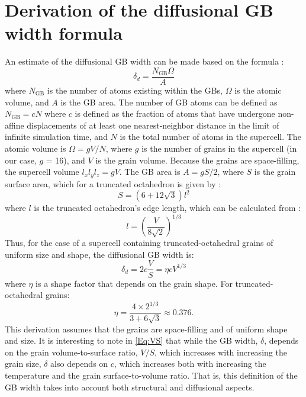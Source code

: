 \documentclass[preprint,12pt,sort&compress]{elsarticle} %
\newcommand{\?}{\stackrel{?}{=}}
\providecommand{\DIFaddbegin}{\protect\color{blue}} %
\providecommand{\DIFaddend}{\protect\color{black}} %
\providecommand{\DIFdelbegin}{\protect\color{red}} %
\providecommand{\DIFdelend}{\protect\color{black}} %
\newcommand{\DIFscaledelfig}{0.5}
\newlength{\DIFdelgraphicswidth} %
\newlength{\DIFdelgraphicsheight} %
\newcommand{\DIFaddincludegraphics}[2][]{{\color{blue}\fbox{\DIFOincludegraphics[#1]{#2}}}} %
\newcommand{\DIFdelincludegraphics}[2][]{%
\sbox{\DIFdelgraphicsbox}{\DIFOincludegraphics[#1]{#2}}%
\settoboxwidth{\DIFdelgraphicswidth}{\DIFdelgraphicsbox} %
\settoboxtotalheight{\DIFdelgraphicsheight}{\DIFdelgraphicsbox} %
\scalebox{\DIFscaledelfig}{%
\parbox[b]{\DIFdelgraphicswidth}{\usebox{\DIFdelgraphicsbox}\\[-\baselineskip] \rule{\DIFdelgraphicswidth}{0em}}\llap{\resizebox{\DIFdelgraphicswidth}{\DIFdelgraphicsheight}{%
\setlength{\unitlength}{\DIFdelgraphicswidth}%
\begin{picture}(1,1)%
\thicklines\linethickness{2pt} %
{\color[rgb]{1,0,0}\put(0,0){\framebox(1,1){}}}%
{\color[rgb]{1,0,0}\put(0,0){\line( 1,1){1}}}%
{\color[rgb]{1,0,0}\put(0,1){\line(1,-1){1}}}%
\end{picture}%
}\hspace*{3pt}}} %
} %
\DeclareRobustCommand{\DIFaddbegin}{\DIFOaddbegin \let\includegraphics\DIFaddincludegraphics} %
\DeclareRobustCommand{\DIFaddend}{\DIFOaddend \let\includegraphics\DIFOincludegraphics} %
\DeclareRobustCommand{\DIFdelbegin}{\DIFOdelbegin \let\includegraphics\DIFdelincludegraphics} %
\DeclareRobustCommand{\DIFdelend}{\DIFOaddend \let\includegraphics\DIFOincludegraphics} %
\begin{document}
\appendix

\section{Derivation of the diffusional GB width formula}
\label{app}

An estimate of the diffusional GB width can be made based on the formula \cite{Keblinski1999}:
\begin{equation}
\delta_d = \frac{N_{\mathrm{GB}} \Omega}{A} 
\label{Eq:dNGB}
\end{equation}
where $N_{\mathrm{GB}}$ is the number of atoms existing within the GBs, $\Omega$ is the atomic volume, and $A$ is the GB area. The number of GB atoms can be defined as $N_\mathrm{GB} = c N$ \cite{Haslam2004} where $c$ is defined as the fraction of atoms that have undergone non-affine displacements of at least one nearest-neighbor distance in the limit of infinite simulation time, and $N$ is the total number of atoms in the supercell. The atomic volume is $\Omega = gV/N$, where $g$ is the number of grains in the supercell (in our case, $g$ = 16), and $V$ is the grain volume. Because the grains are space-filling, the supercell volume $l_x l_y l_z = gV$. The GB area is $A = g S / 2$, where $S$ is the grain surface area, which for a truncated octahedron is given by \cite{Weisstein}:
\begin{equation}
S = \left( 6 + 12 \sqrt{3} \right) l^2    
\end{equation}
where $l$ is the truncated octahedron's edge length, which can be calculated from \cite{Weisstein}:
\begin{equation}
l = \left( \frac{V}{8 \sqrt{2}} \right)^{1/3}
\end{equation}
Thus, for the case of a supercell containing truncated-octahedral grains of uniform size and shape, the diffusional GB width is:
\begin{equation}
\delta_d = 2 c \frac{V}{S} = \eta c V^{1/3}
\label{Eq:VS}
\end{equation}
where $\eta$ is a shape factor that depends on the grain shape. For truncated-octahedral grains:
\DIFdelbegin %
\DIFdelend \DIFaddbegin \begin{equation}\label{eq:shape}
\eta = \frac{4 \times 2^{1/3}}{3 + 6 \sqrt{3}} \approx 0.376.
\end{equation}\DIFaddend 
This derivation assumes that the grains are space-filling and of uniform shape and size. It is interesting to note in \cref{Eq:VS} that while the GB width, $\delta$, depends on the grain volume-to-surface ratio, $V/S$, which increases with increasing the grain size, $\delta$ also depends on $c$, which increases both with increasing the temperature and the grain surface-to-volume ratio. That is, this definition of the GB width takes into account both structural and diffusional aspects.



\end{document}
